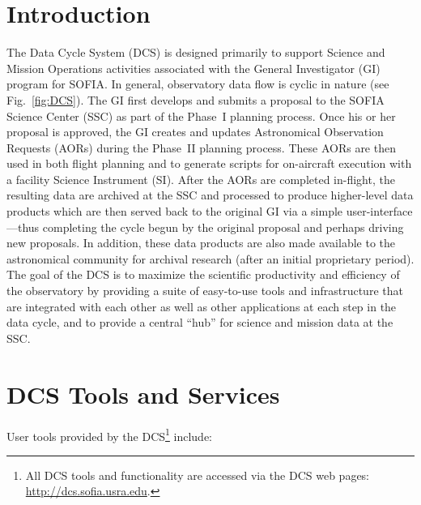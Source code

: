 \section{Introduction}

The Data Cycle System (DCS) is designed primarily to support Science and Mission Operations activities associated with the General Investigator (GI) program for SOFIA. In general, observatory data flow is cyclic in nature (see Fig.~\ref{fig:DCS}).  The GI first develops and submits a proposal to the SOFIA Science Center (SSC) as part of the Phase~I planning process. Once his or her proposal is approved, the GI creates and updates Astronomical Observation Requests (AORs) during the Phase~II planning process. These AORs are then used in both flight planning and to generate scripts for on-aircraft execution with a facility Science Instrument (SI). After the AORs are completed in-flight, the resulting data are archived at the SSC and processed to produce higher-level data products which are then served back to the original GI via a simple user-interface---thus completing the cycle begun by the original proposal and perhaps driving new proposals. In addition, these data products are also made available to the astronomical community for archival research (after an initial proprietary period).  The goal of the DCS is to maximize the scientific productivity and efficiency of the observatory by providing a suite of easy-to-use tools and infrastructure that are integrated with each other as well as other applications at each step in the data cycle, and to provide a central ``hub'' for science and mission data at the SSC.



\section{DCS Tools and Services}

User tools provided by the DCS\footnote{All DCS tools and functionality are accessed via the DCS web pages:  \url{http://dcs.sofia.usra.edu}. } 
include:

